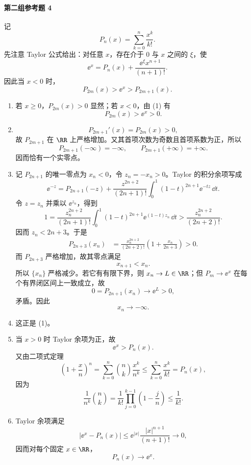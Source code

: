 \paragraph{第二组参考题 4}
\begin{xsolution}
记
\[
  P_n(x)=\sum_{k=0}^n\frac{x^k}{k!}.
\]
先注意 Taylor 公式给出：对任意 $x$，存在介于 $0$ 与 $x$ 之间的 $\xi$，使
\[
  \ee^x=P_n(x)+\frac{\ee^\xi x^{n+1}}{(n+1)!}.
\]
因此当 $x<0$ 时，
\[
  P_{2m}(x)>\ee^x>P_{2m+1}(x).
\tag{1}
\]

\begin{enumerate}[label=(\arabic*)]
  \item 若 $x\ge0$，$P_{2m}(x)>0$ 显然；若 $x<0$，由 (1) 有
  \[
    P_{2m}(x)>\ee^x>0.
  \]

  \item
  \[
    P_{2m+1}'(x)=P_{2m}(x)>0,
  \]
  故 $P_{2m+1}$ 在 $\RR$ 上严格增加。又其首项次数为奇数且首项系数为正，所以
  \[
    P_{2m+1}(-\infty)=-\infty,
    \qquad P_{2m+1}(+\infty)=+\infty.
  \]
  因而恰有一个实零点。

  \item 记 $P_{2n+1}$ 的唯一零点为 $x_n<0$，令 $z_n=-x_n>0$。Taylor 的积分余项写成
  \[
    \ee^{-z}
    =P_{2n+1}(-z)
     +\frac{z^{2n+2}}{(2n+1)!}
      \int_0^1(1-t)^{2n+1}\ee^{-tz}\,\dd t.
  \]
  令 $z=z_n$ 并乘以 $\ee^{z_n}$，得到
  \[
    1=\frac{z_n^{2n+2}}{(2n+1)!}
      \int_0^1(1-t)^{2n+1}\ee^{(1-t)z_n}\,\dd t
    >\frac{z_n^{2n+2}}{(2n+2)!}.
  \]
  因而 $z_n<2n+3$。于是
  \begin{align*}
    P_{2n+3}(x_n)
    &=\frac{x_n^{2n+2}}{(2n+2)!}
      \left(1+\frac{x_n}{2n+3}\right)>0.
  \end{align*}
  而 $P_{2n+3}$ 严格增加，故其零点满足
  \[
    x_{n+1}<x_n.
  \]
  所以 $\{x_n\}$ 严格减少。若它有有限下界，则 $x_n\to L\in\RR$；但 $P_m\to\ee^x$ 在每个有界闭区间上一致成立，故
  \[
    0=P_{2n+1}(x_n)\to\ee^L>0,
  \]
  矛盾。因此
  \[
    \boxed{x_n\to-\infty}.
  \]

  \item 这正是 (1)。

  \item 当 $x>0$ 时 Taylor 余项为正，故
  \[
    \ee^x>P_n(x).
  \]
  又由二项式定理
  \[
    \left(1+\frac xn\right)^n
    =\sum_{k=0}^n\binom nk\frac{x^k}{n^k}
    \le\sum_{k=0}^n\frac{x^k}{k!}=P_n(x),
  \]
  因为
  \[
    \frac1{n^k}\binom nk
    =\frac1{k!}\prod_{j=0}^{k-1}\left(1-\frac jn\right)
    \le\frac1{k!}.
  \]

  \item Taylor 余项满足
  \[
    |\ee^x-P_n(x)|
    \le \ee^{|x|}\frac{|x|^{n+1}}{(n+1)!}\to0,
  \]
  因而对每个固定 $x\in\RR$，
  \[
    \boxed{P_n(x)\to\ee^x}.
  \]
\end{enumerate}
\end{xsolution}

